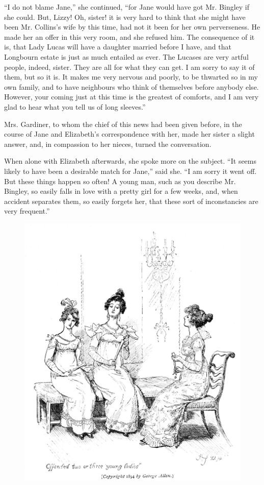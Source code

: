 \documentclass[10pt]{book}
\begin{document}
   “I do not blame Jane,” she continued, “for Jane would have got Mr.
Bingley if she could. But, Lizzy! Oh, sister! it is very hard to think
that she might have been Mr. Collins’s wife by this time, had not it
been for her own perverseness. He made her an offer in this very room,
and she refused him. The consequence of it is, that Lady Lucas will have
a daughter married before I have, and that Longbourn estate is just as
much entailed as ever. The Lucases are very artful people, indeed,
sister. They are all for what they can get. I am sorry to say it of
them, but so it is. It makes me very nervous and poorly, to be thwarted
so in my own family, and to have neighbours who think of themselves
before anybody else. However, your coming just at this time is the
greatest of comforts, and I am very glad to hear what you tell us of
long sleeves.”
  

   Mrs. Gardiner, to whom the chief of this news had been given before, in
the course of Jane and Elizabeth’s correspondence with her, made her
sister a slight answer, and, in compassion to her nieces, turned the
conversation.
  

   When alone with Elizabeth afterwards, she spoke more
   on the subject.
“It seems likely to have been a desirable match for Jane,” said she. “I
am sorry it went off. But these things happen so often! A young man,
such as you describe Mr. Bingley, so easily falls in love with a pretty
girl for a few weeks, and, when accident separates them, so easily
forgets her, that these sort of inconstancies are very frequent.”
  

\begin{figure}[h]
\centering
\includegraphics[width=\linewidth]{images/i_206.jpg}
\end{figure}
\end{document}

